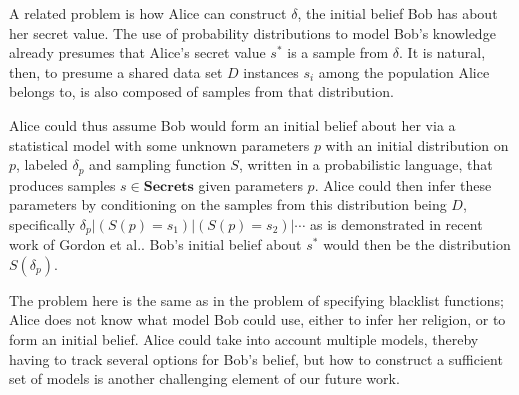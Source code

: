 \documentclass{article} %
\newcommand{\pxm}[1]{\textcolor{red}{PM -- #1}}
\newcommand{\blacklists}[0]{\textbf{Blacklists}}
\newcommand{\whitelists}[0]{\textbf{Whitelists}}
\newcommand{\secrets}[0]{\textbf{Secrets}}
\newcommand{\asecret}[0]{s}
\newcommand{\rsecret}[0]{\asecret^*}
\newcommand{\cond}[0]{|}
\theoremstyle{plain} %
\theoremstyle{definition} %
\begin{document}
A related problem is how Alice can construct $ \delta $, the initial
belief Bob has about her secret value. The use of probability
distributions to model Bob's knowledge already presumes that Alice's
secret value $ \rsecret $ is a sample from $ \delta $. It is natural,
then, to presume a shared data set $ D $ instances $ \asecret_i $ among the
population Alice belongs to, is also composed of samples from that
distribution.

Alice could thus assume Bob would form an initial belief about her via
a statistical model with some unknown parameters $ p $ with an initial
distribution on $ p $, labeled $ \delta_p $ and sampling function $ S
$, written in a probabilistic language, that produces samples $
\asecret \in \secrets $ given parameters $ p $. Alice could then infer
these parameters by conditioning on the samples from this distribution
being $ D $, specifically $ \delta_p \cond (S(p) = \asecret_1) \cond
(S(p) = \asecret_2) \cond \cdots $ as is demonstrated in recent work
of Gordon et al.\cite{gordon13model}. Bob's initial belief about $
\rsecret $ would then be the distribution $ S(\delta_p) $.

The problem here is the same as in the problem of specifying blacklist
functions; Alice does not know what model Bob could use, either to
infer her religion, or to form an initial belief. Alice could take
into account multiple models, thereby having to track several options
for Bob's belief, but how to construct a sufficient set of models is
another challenging element of our future work.


\end{document}
